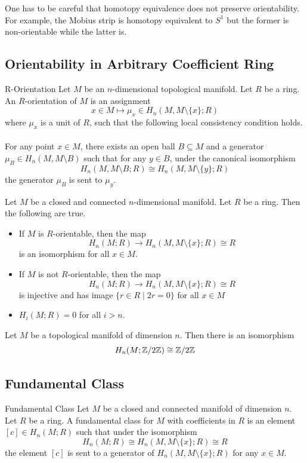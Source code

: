 \documentclass[a4paper]{article}
\begin{document}
One has to be careful that homotopy equivalence does not preserve orientability. For example, the Mobius strip is homotopy equivalent to $S^1$ but the former is non-orientable while the latter is. 

\subsection{Orientability in Arbitrary Coefficient Ring}
\begin{defn}{R-Orientation}{} Let $M$ be an $n$-dimensional topological manifold. Let $R$ be a ring. An $R$-orientation of $M$ is an assignment $$x\in M\mapsto\mu_x\in H_n(M,M\setminus\{x\};R)$$ where $\mu_x$ is a unit of $R$, such that the following local consistency condition holds. \\~\\

For any point $x\in M$, there exists an open ball $B\subseteq M$ and a generator $\mu_B\in H_n(M,M\setminus B)$ such that for any $y\in B$, under the canonical isomorphism $$H_n(M,M\setminus B;R)\cong H_n(M,M\setminus\{y\};R)$$ the generator $\mu_B$ is sent to $\mu_y$. 
\end{defn}

\begin{thm}{}{} Let $M$ be a closed and connected $n$-dimensional manifold. Let $R$ be a ring. Then the following are true. 
\begin{itemize}
\item If $M$ is $R$-orientable, then the map $$H_n(M;R)\to H_n(M,M\setminus\{x\};R)\cong R$$ is an isomorphism for all $x\in M$. 
\item If $M$ is not $R$-orientable, then the map $$H_n(M;R)\to H_n(M,M\setminus\{x\};R)\cong R$$ is injective and has image $\{r\in R\;|\;2r=0\}$ for all $x\in M$
\item $H_i(M;R)=0$ for all $i>n$. 
\end{itemize}
\end{thm}

\begin{crl}{}{} Let $M$ be a topological manifold of dimension $n$. Then there is an isomorphism $$H_n(M;\mathbb{Z}/2\mathbb{Z})\cong\mathbb{Z}/2\mathbb{Z}$$
\end{crl}

\subsection{Fundamental Class}
\begin{defn}{Fundamental Class}{} Let $M$ be a closed and connected manifold of dimension $n$. Let $R$ be a ring. A fundamental class for $M$ with coefficients in $R$ is an element $[c]\in H_n(M;R)$ such that under the isomorphism $$H_n(M;R)\cong H_n(M,M\setminus\{x\};R)\cong R$$ the element $[c]$ is sent to a generator of $H_n(M,M\setminus\{x\};R)$ for any $x\in M$. 
\end{defn}
\end{document}
